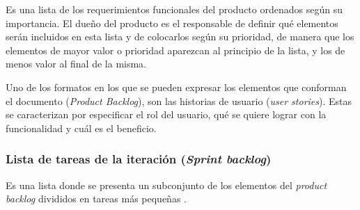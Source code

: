 Es una lista de los requerimientos funcionales del producto ordenados según su importancia. El dueño del producto es el responsable de definir qué elementos serán incluidos en esta lista y de colocarlos según su prioridad, de manera que los elementos de mayor valor o prioridad aparezcan al principio de la lista, y los de menos valor al final de la misma\cite{SCRM2}. 

Uno de los formatos en los que se pueden expresar los elementos que conforman el documento (\textit{Product Backlog}), son las historias de usuario (\textit{user stories}). Estas se caracterizan por especificar el rol del usuario, qué se quiere lograr con la funcionalidad y cuál es el beneficio\cite{SCRM2}.

\subsubsection{Lista de tareas de la iteración (\textit{Sprint backlog})}

Es una lista donde se presenta un subconjunto de los elementos del \textit{product backlog} divididos en tareas más pequeñas \cite{SCRM2}. 


